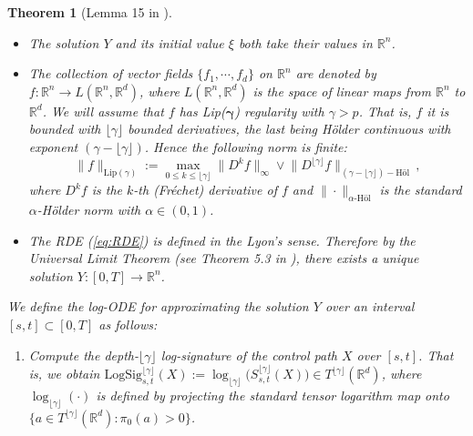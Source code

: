 \documentclass{article}
\def\floor#1{\lfloor #1 \rfloor}
\newcommand{\R}{\mathbb{R}}
\newtheorem{theorem}{Theorem}[section]
\newcommand{\logsig}{\mathrm{LogSig}}
\begin{document}
\begin{theorem}[Lemma 15 in \citet{logode2014estimate}]
\begin{itemize}
\item The solution $Y$ and its initial value $\xi$ both take their values in $\R^n$.

\item The collection of vector fields $\{f_1, \cdots, f_d\}$ on $\R^n$ are denoted by $f : \R^n\rightarrow L(\R^n, \R^d)$,
where $L(\R^n, \R^d)$ is the space of linear maps from $\R^n$ to $\R^d$. We will assume that $f$ has \emph{\textup{Lip(}$\boldsymbol{\gamma}$\textup{)} regularity} with $\gamma > p$. 
That is, $f$ it is bounded with $\floor{\gamma}$ bounded derivatives, the last being H\"{o}lder continuous with exponent $(\gamma - \floor\gamma)$. Hence the following norm is finite:
\begin{equation}
\|f\|_{\mathrm{Lip}(\gamma)} := \max_{0 \leq k\leq \floor{\gamma}}\big\|D^k f\big\|_{\infty} \vee \big\|D^{\floor{\gamma}} f\big\|_{(\gamma - \floor{\gamma})-\text{H\"{o}l}}\,,
\label{eq:lipgamma}
\end{equation}
where $D^k f$ is the $k$-th (Fr\'{e}chet) derivative of $f$ and $\|\cdot\|_{\alpha\text{-H\"{o}l}}$ is the standard $\alpha$-H\"{o}lder norm with $\alpha\in(0,1)$.

\item The RDE (\ref{eq:RDE}) is defined in the Lyon's sense. Therefore by the Universal Limit Theorem
(see Theorem 5.3 in \citet{roughpath2007notes}), there exists a unique solution $Y : [0,T]\rightarrow\R^n$.
\end{itemize}

We define the log-ODE for approximating the solution $Y$ over an interval $[s,t]\subset [0,T]$ as follows: 
\begin{enumerate}
\item Compute the depth-$\floor{\gamma}$ log-signature of the control path $X$ over $[s,t]$. That is, we obtain $\logsig_{s,t}^{\floor{\gamma}}(X) := \log_{\floor{\gamma}}\big(S_{s,t}^{\floor{\gamma}}(X)\big) \in T^{\floor{\gamma}}(\R^d)$, where $\log_{\floor{\gamma}}(\cdot)$ is defined by projecting the standard tensor logarithm map onto $\{a\in T^{\floor{\gamma}}(\R^d) : \pi_0(a)>0\}$.


\end{enumerate}
\end{theorem}
\end{document}
